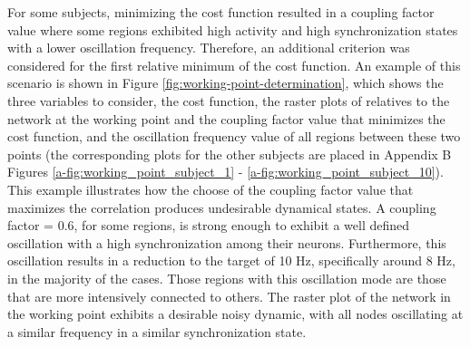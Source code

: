 \documentclass[../main.tex]{subfiles}
\begin{document}
For some subjects, minimizing the cost function resulted in a coupling factor value where some regions exhibited high activity and high synchronization states with a lower oscillation frequency.
Therefore, an additional criterion was considered for the first relative minimum of the cost function.
An example of this scenario is shown in Figure \ref{fig:working-point-determination}, which shows the three variables to consider, the cost function, the raster plots of relatives to the network at the working point and the coupling factor value that minimizes the cost function, and the oscillation frequency value of all regions between these two points (the corresponding plots for the other subjects are placed in Appendix B Figures \ref{a-fig:working_point_subject_1} - \ref{a-fig:working_point_subject_10}).
This example illustrates how the choose of the coupling factor value that maximizes the correlation produces undesirable dynamical states.
A coupling factor = 0.6, for some regions, is strong enough to exhibit a well defined oscillation with a high synchronization among their neurons.
Furthermore, this oscillation results in a reduction to the target of 10 Hz, specifically around 8 Hz, in the majority of the cases.
Those regions with this oscillation mode are those that are more intensively connected to others.
The raster plot of the network in the working point exhibits a desirable noisy dynamic, with all nodes oscillating at a similar frequency in a similar synchronization state.
\end{document}
